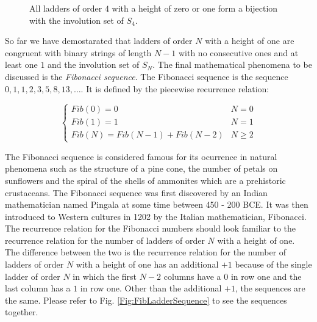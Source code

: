 \begin{figure}
        \caption{All ladders of order $4$ with a height of zero or one form a bijection with the involution set of $S_{4}$.}
        \label{Fig:BijectiveMapping}
\end{figure}
\pagebreak
So far we have demostarated that ladders of order $N$ with a height of one are congruent with binary strings of length $N-1$ 
with no consecutive ones and at least one $1$ and the involution set of $S_{N}$. The final mathematical phenomena to be discussed 
is the \emph{Fibonacci sequence}. The Fibonacci sequence is the sequence $0,1,1,2,3,5,8,13, \dots$. It is defined by the piecewise 
recurrence relation:\cite{A12}

 \[   
     \left\{
       \begin{array}{ll}
        Fib(0) = 0 & N = 0 \\
        Fib(1) = 1 & N=1 \\
        Fib(N) = Fib(N-1) + Fib(N-2) & N \geq 2 
        \end{array} 
    \right.
\]


The Fibonacci sequence is considered famous for its ocurrence in natural phenomena such as the structure of a pine cone, the number of petals 
on sunflowers and the spiral of the shells of ammonites which are a prehistoric crustaceans. The Fibonacci sequence was first discovered by an 
Indian mathematician named Pingala at some time between 450 - 200 BCE. \cite{A16} It was then introduced to Western cultures in 1202 by the 
Italian mathematician, Fibonacci. The recurrence relation for the Fibonacci numbers should look familiar to the recurrence 
relation for the number of ladders of order $N$ with a height of one. The difference between the two is the recurrence relation 
for the number of ladders of order $N$ with a height of one has an additional $+1$ because of the single ladder of 
order $N$ in which the first $N-2$ columns have a $0$ in row one and the last column has a $1$ in row one. Other than the additional 
$+1$, the sequences are the same. Please refer to Fig. \ref{Fig:FibLadderSequence} to see the sequences together.\newline
    
